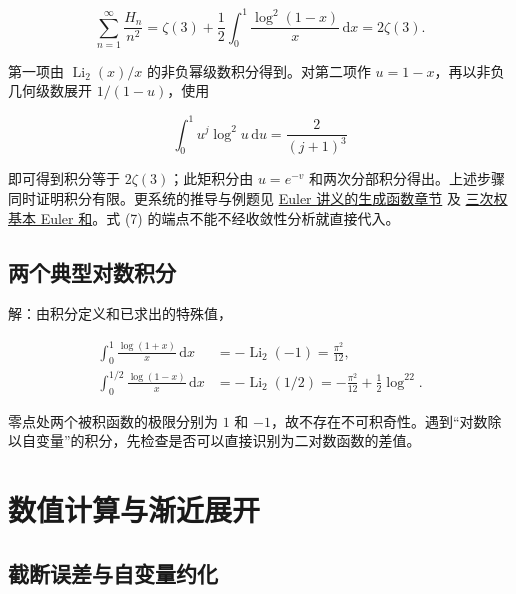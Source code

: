 \documentclass[11pt,a4paper]{article}
\begin{document}
\[
\sum_{n=1}^{\infty}\frac{H_n}{n^2}
=\zeta(3)+\frac12\int_0^1\frac{\log^2(1-x)}x\,\mathrm dx
=2\zeta(3).
\]

第一项由 \(\operatorname{Li}_2(x)/x\) 的非负幂级数积分得到。对第二项作 \(u=1-x\)，再以非负几何级数展开 \(1/(1-u)\)，使用

\[
\int_0^1u^j\log^2u\,\mathrm du=\frac{2}{(j+1)^3}
\]

即可得到积分等于 \(2\zeta(3)\)；此矩积分由 \(u=e^{-v}\) 和两次分部积分得出。上述步骤同时证明积分有限。更系统的推导与例题见 \href{https://vincent-arqain.github.io/math-notes/notes/890e1516e64e21a2fb2248b4/\#生成函数与除以指标}{Euler 讲义的生成函数章节} 及 \href{https://vincent-arqain.github.io/math-notes/notes/890e1516e64e21a2fb2248b4/\#例-4严格计算三次权的基本-euler-和}{三次权基本 Euler 和}。式 (7) 的端点不能不经收敛性分析就直接代入。

\hypertarget{ux4e24ux4e2aux5178ux578bux5bf9ux6570ux79efux5206}{%
\subsection{两个典型对数积分}\label{ux4e24ux4e2aux5178ux578bux5bf9ux6570ux79efux5206}}

解：由积分定义和已求出的特殊值，

\[
\begin{aligned}
\int_0^1\frac{\log(1+x)}x\,\mathrm dx
&=-\operatorname{Li}_2(-1)=\frac{\pi^2}{12},\\
\int_0^{1/2}\frac{\log(1-x)}x\,\mathrm dx
&=-\operatorname{Li}_2(1/2)=-\frac{\pi^2}{12}+\frac12\log^22.
\end{aligned}
\]

零点处两个被积函数的极限分别为 \(1\) 和 \(-1\)，故不存在不可积奇性。遇到``对数除以自变量''的积分，先检查是否可以直接识别为二对数函数的差值。

\hypertarget{ux6570ux503cux8ba1ux7b97ux4e0eux6e10ux8fd1ux5c55ux5f00}{%
\section{数值计算与渐近展开}\label{ux6570ux503cux8ba1ux7b97ux4e0eux6e10ux8fd1ux5c55ux5f00}}

\hypertarget{ux622aux65adux8befux5deeux4e0eux81eaux53d8ux91cfux7ea6ux5316}{%
\subsection{截断误差与自变量约化}\label{ux622aux65adux8befux5deeux4e0eux81eaux53d8ux91cfux7ea6ux5316}}
\end{document}
